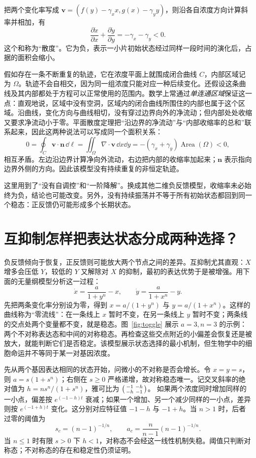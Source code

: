 把两个变化率写成 $\bm v=(f(y)-\gamma_xx,g(x)-\gamma_yy)$，则沿各自浓度方向计算斜率并相加，有
\[
\frac{\partial\dot x}{\partial x}+\frac{\partial\dot y}{\partial y}=-\gamma_x-\gamma_y<0.
\]
这个和称为“散度”。它为负，表示一小片初始状态经过同样一段时间的演化后，占据的面积会缩小。

假如存在一条不断重复的轨迹，它在浓度平面上就围成闭合曲线 $C$，内部区域记为 $\Omega$。轨迹不会自相交，因为同一组浓度只能对应一种后续变化。还假设这条曲线及其内部都处于方程可以正常使用的范围内。数学上常通过\emph{单连通区域}保证这一点：直观地说，区域中没有空洞，区域内的闭合曲线所围住的内部也属于这个区域。沿曲线，变化方向与曲线相切，没有穿过边界向外的净流动；但内部处处收缩又要求净流动小于零。平面散度定理把“沿边界的净流动”与“内部收缩率的总和”联系起来，因此这两种说法可以写成同一个面积关系：
\[
0=\oint_C\bm v\cdot\bm n\,\dd\ell
=\iint_\Omega\nabla\cdot\bm v\,\dd x\dd y
=-(\gamma_x+\gamma_y)\operatorname{Area}(\Omega)<0,
\]
相互矛盾。左边沿边界计算净向外流动，右边把内部的收缩率加起来；$\bm n$ 表示指向边界外侧的方向。因此该模型没有持续重复的非恒定轨迹。

这里用到了“没有自调控”和“一阶降解”。换成其他二维负反馈模型，收缩率未必始终为负，结论也可能改变。另外，没有持续振荡并不等于所有初始状态都回到同一个稳态：正反馈仍可能形成多个长期状态。

\section{互抑制怎样把表达状态分成两种选择？}
负反馈倾向于恢复，正反馈则可能放大两个节点之间的差异。互抑制尤其直观：$X$ 增多会压低 $Y$，较低的 $Y$ 又解除对 $X$ 的抑制，最初的表达优势于是被增强。用下面的无量纲模型分析这一过程：
\begin{equation}\dot x=\frac{a}{1+y^n}-x,\qquad\dot y=\frac{a}{1+x^n}-y.\label{eq:toggle}\end{equation}
先把两条变化率分别设为零，得到 $x=a/(1+y^n)$ 与 $y=a/(1+x^n)$。这样的曲线称为“零流线”：在一条线上 $x$ 暂时不变，在另一条线上 $y$ 暂时不变；两条线的交点处两个变量都不变，就是稳态。图~\ref{fig:toggle} 展示 $a=3,n=3$ 的示例：两个不对称表达态和中间的对称稳态。再检查这些交点附近的小偏差会恢复还是被放大，就能判断它们是否稳定。该模型展示状态选择的最小机制，但生物学中的细胞命运并不等同于某一对基因浓度。

先从两个基因表达相同的状态开始，问微小的不对称是否会增长。令 $x=y=s$，则 $a=s(1+s^n)$；右侧在 $s\geq0$ 严格递增，故对称稳态唯一。记交叉斜率的绝对值为
$h=ns^n/(1+s^n)$，雅可比为 $\begin{psmallmatrix}-1&-h\\-h&-1\end{psmallmatrix}$。
如果两个浓度同时增加同样的一小点，偏差按 $e^{(-1-h)t}$ 衰减；如果一个增加、另一个减少同样的一小点，差异则按 $e^{(-1+h)t}$ 变化。这分别对应特征值 $-1-h$ 与 $-1+h$。当 $n>1$ 时，后者过零的阈值为
\[
s_c=(n-1)^{-1/n},\qquad a_c=\frac n{n-1}(n-1)^{-1/n}.
\]
当 $n\leq1$ 时有限 $s>0$ 下 $h<1$，对称态不会经这一线性机制失稳。阈值只判断对称态；不对称态的存在和稳定性仍须证明。

